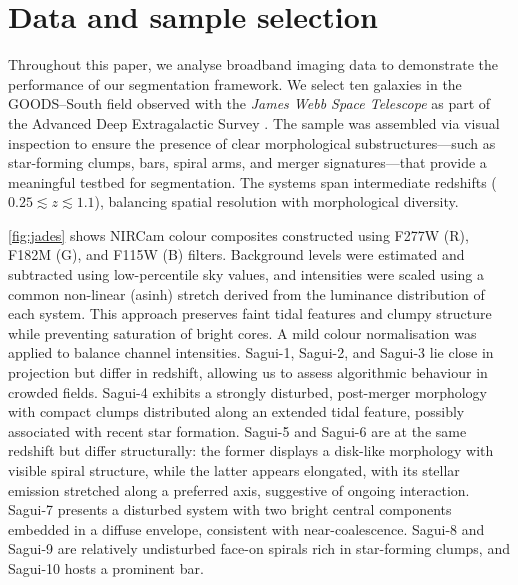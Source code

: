 \documentclass[fleqn,usenatbib]{mnras}
\begin{document}
\section{Data and sample selection}
\label{sec:data}
Throughout this paper, we analyse broadband imaging data to demonstrate the performance of our segmentation framework.
We select ten galaxies in the GOODS–South field observed with the \textit{James Webb Space Telescope} as part of the Advanced Deep Extragalactic Survey \citep[JADES;][]{rieke2023, eisenstein2023a, eisenstein2023b}. The sample was assembled via visual inspection to ensure the presence of clear morphological substructures—such as star-forming clumps, bars, spiral arms, and merger signatures—that provide a meaningful testbed for segmentation. The systems span intermediate redshifts ($0.25 \lesssim z \lesssim 1.1$), balancing spatial resolution with morphological diversity.

\autoref{fig:jades} shows NIRCam colour composites constructed using F277W (R), F182M (G), and F115W (B) filters. Background levels were estimated and subtracted using low-percentile sky values, and intensities were scaled using a common non-linear (asinh) stretch derived from the luminance distribution of each system. This approach preserves faint tidal features and clumpy structure while preventing saturation of bright cores. A mild colour normalisation was applied to balance channel intensities. Sagui-1, Sagui-2, and Sagui-3 lie close in projection but differ in redshift, allowing us to assess algorithmic behaviour in crowded fields. Sagui-4 exhibits a strongly disturbed, post-merger morphology with compact clumps distributed along an extended tidal feature, possibly associated with recent star formation. Sagui-5 and Sagui-6 are at the same redshift but differ structurally: the former displays a disk-like morphology with visible spiral structure,  while the latter appears elongated,  with its stellar emission stretched along a preferred axis, suggestive of ongoing interaction.  Sagui-7 presents a disturbed system with two bright central components embedded in a diffuse envelope, consistent with near-coalescence. Sagui-8 and Sagui-9 are relatively undisturbed face-on spirals rich in star-forming clumps, and Sagui-10 hosts a prominent bar.
\end{document}
